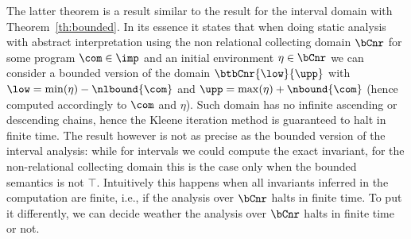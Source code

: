 The latter theorem is a result similar to the result for the interval
domain with Theorem~\ref{th:bounded}. In its essence it states that
when doing static analysis with abstract interpretation using the non
relational collecting domain \(\bCnr\) for some program
\(\com\in\imp\) and an initial environment \(\eta \in \bCnr\) we can
consider a bounded version of the domain \(\btbCnr{\low}{\upp}\) with
\(\low = \min(\eta) - \nlbound{\com}\) and
\(\upp = \max(\eta) + \nbound{\com}\) (hence computed accordingly to
\(\com\) and \(\eta\)). Such domain has no infinite ascending or
descending chains, hence the Kleene iteration method is guaranteed to
halt in finite time. The result however is not as precise as the
bounded version of the interval analysis: while for intervals we could
compute the exact invariant, for the non-relational collecting domain
this is the case only when the bounded semantics is not
\(\top\). Intuitively this happens when all invariants inferred in the
computation are finite, i.e., if the analysis over \(\bCnr\) halts in
finite time. To put it differently, we can decide weather the analysis
over \(\bCnr\) halts in finite time or not.
